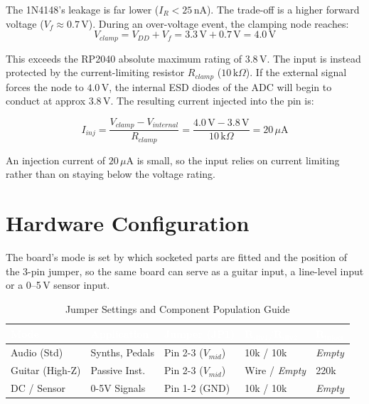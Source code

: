 \documentclass[11pt, a4paper]{report}
\begin{document}
The 1N4148's leakage is far lower ($I_R < 25\,\text{nA}$).\cite{generic_1n4148_datasheet} The trade-off is a higher forward voltage ($V_f \approx 0.7\,\text{V}$).\cite{generic_1n4148_datasheet} During an over-voltage event, the clamping node reaches:
\begin{equation}
  V_{clamp} = V_{DD} + V_f = 3.3\,\text{V} + 0.7\,\text{V} = 4.0\,\text{V}
\end{equation}

This exceeds the RP2040 absolute maximum rating of $3.8\,\text{V}$.\cite{rpi_rp2040_datasheet} The input is instead protected by the current-limiting resistor $R_{clamp}$ ($10\,\text{k}\Omega$). If the external signal forces the node to $4.0\,\text{V}$, the internal ESD diodes of the ADC will begin to conduct at approx $3.8\,\text{V}$. The resulting current injected into the pin is:

\begin{equation}
  I_{inj} = \frac{V_{clamp} - V_{internal}}{R_{clamp}} = \frac{4.0\,\text{V} - 3.8\,\text{V}}{10\,\text{k}\Omega} = 20\,\mu\text{A}
\end{equation}

An injection current of $20\,\mu\text{A}$ is small, so the input relies on current limiting rather than on staying below the voltage rating.

\section{Hardware Configuration}
The board's mode is set by which socketed parts are fitted and the position of the 3-pin jumper, so the same board can serve as a guitar input, a line-level input or a 0--5\,V sensor input.

\begin{table}[htbp]
  \centering
  \small\sffamily
  \renewcommand{\arraystretch}{1.3}

  \begin{tabular}{@{} l l l l l @{}}
    \toprule
    \rowcolor{TableHeader}
    \textbf{\textcolor{white}{Mode}} &
    \textbf{\textcolor{white}{Application}} &
    \textbf{\textcolor{white}{Jumper (JP1)}} &
    \textbf{\textcolor{white}{$\mathbf{R_{div1}/R_{div2}}$}} &
    \textbf{\textcolor{white}{$\mathbf{R_{inject}}$}} \\
    \midrule

    Audio (Std)      & Synths, Pedals & Pin 2-3 ($V_{mid}$) & 10k / 10k      & \textit{Empty} \\
    Guitar (High-Z) & Passive Inst.  & Pin 2-3 ($V_{mid}$) & Wire / \textit{Empty} & 220k \\
    DC / Sensor      & 0-5V Signals   & Pin 1-2 (GND)       & 10k / 10k      & \textit{Empty} \\
    \bottomrule
  \end{tabular}

  \caption{Jumper Settings and Component Population Guide}
  \label{tab:config}
\end{table}
\end{document}
